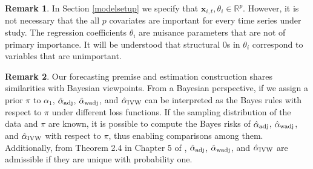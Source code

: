 \documentclass[11pt]{article}
\def\mbf#1{\mathbf{#1}} %
\newcommand{\reals}{\mathbb{R}} %
\theoremstyle{definition}
\newtheorem{remark}{Remark}
\begin{document}
\begin{remark}
\label{remark1}In Section \ref{modelsetup} we specify that $\mbf{x}_{i,t}, \theta_i \in \reals^p$. 
However, it is not necessary that the all $p$ covariates are important for every time series under study. The regression coefficients $\theta_i$ are nuisance parameters that are not of primary importance. 
It will be understood that structural 0s in $\theta_i$ correspond to variables that are unimportant. 
\end{remark}

\begin{remark}
  Our forecasting premise and estimation construction shares similarities with Bayesian viewpoints. From a Bayesian perspective, if we assign a prior $\pi$ to $\alpha_1$, $\hat{\alpha}_{\rm adj}$, $\hat{\alpha}_{\rm wadj}$, and $\hat{\alpha}_{\rm IVW}$ can be interpreted as the Bayes rules with respect to $\pi$ under different loss functions. If the sampling distribution of the data and $\pi$ are known, it is possible to compute the Bayes risks of $\hat{\alpha}_{\rm adj}$, $\hat{\alpha}_{\rm wadj}$, and $\hat{\alpha}_{\rm IVW}$ with respect to $\pi$,  thus enabling comparisons among them. Additionally, from Theorem 2.4 in Chapter 5 of \cite{lehmann2006theory}, $\hat{\alpha}_{\rm adj}$, $\hat{\alpha}_{\rm wadj}$, and $\hat{\alpha}_{\rm IVW}$ are admissible if they are unique with probability one.
\end{remark}
\end{document}
